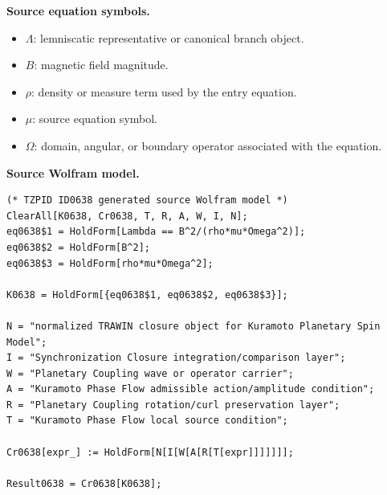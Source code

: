 \begin{minipage}[t]{0.49\linewidth}
\begingroup
\small
\raggedright
\textbf{Source equation symbols.}\par
\begin{itemize}[leftmargin=1.35em,itemsep=1pt,topsep=1pt,parsep=0pt]
    \item $\Lambda$: lemniscatic representative or canonical branch object.
    \item $B$: magnetic field magnitude.
    \item $\rho$: density or measure term used by the entry equation.
    \item $\mu$: source equation symbol.
    \item $\Omega$: domain, angular, or boundary operator associated with the equation.
\end{itemize}
\endgroup
\end{minipage}\hfill
\begin{minipage}[t]{0.47\linewidth}
\begingroup
\scriptsize
\raggedright
\textbf{Source Wolfram model.}\par
\begin{Verbatim}[fontsize=\tiny,breaklines=true,breakanywhere=true]
(* TZPID ID0638 generated source Wolfram model *)
ClearAll[K0638, Cr0638, T, R, A, W, I, N];
eq0638$1 = HoldForm[Lambda == B^2/(rho*mu*Omega^2)];
eq0638$2 = HoldForm[B^2];
eq0638$3 = HoldForm[rho*mu*Omega^2];

K0638 = HoldForm[{eq0638$1, eq0638$2, eq0638$3}];

N = "normalized TRAWIN closure object for Kuramoto Planetary Spin Model";
I = "Synchronization Closure integration/comparison layer";
W = "Planetary Coupling wave or operator carrier";
A = "Kuramoto Phase Flow admissible action/amplitude condition";
R = "Planetary Coupling rotation/curl preservation layer";
T = "Kuramoto Phase Flow local source condition";

Cr0638[expr_] := HoldForm[N[I[W[A[R[T[expr]]]]]]];

Result0638 = Cr0638[K0638];
\end{Verbatim}
\endgroup
\end{minipage}

